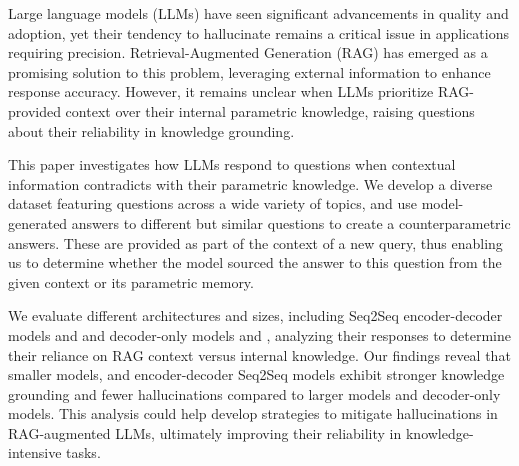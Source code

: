Large language models (LLMs) have seen significant advancements in quality and adoption, yet their tendency to hallucinate remains a critical issue in applications requiring precision.
Retrieval-Augmented Generation (RAG) has emerged as a promising solution to this problem, leveraging external information to enhance response accuracy.
However, it remains unclear when LLMs prioritize RAG-provided context over their internal parametric knowledge, raising questions about their reliability in knowledge grounding.

This paper investigates how LLMs respond to questions when contextual information contradicts with their parametric knowledge.
We develop a diverse dataset featuring questions across a wide variety of topics, and use model-generated answers to different but similar questions to create a counterparametric answers.
These are provided as part of the context of a new query, thus enabling us to determine whether the model sourced the answer to this question from the given context or its parametric memory.

We evaluate different architectures and sizes, including Seq2Seq encoder-decoder models \smallflan{} and \bigflan{} and decoder-only models \smallllama{} and \bigllama{}, analyzing their responses to determine their reliance on RAG context versus internal knowledge.
Our findings reveal that smaller models, and encoder-decoder Seq2Seq models exhibit stronger knowledge grounding and fewer hallucinations compared to larger models and decoder-only models.
This analysis could help develop strategies to mitigate hallucinations in RAG-augmented LLMs, ultimately improving their reliability in knowledge-intensive tasks.
